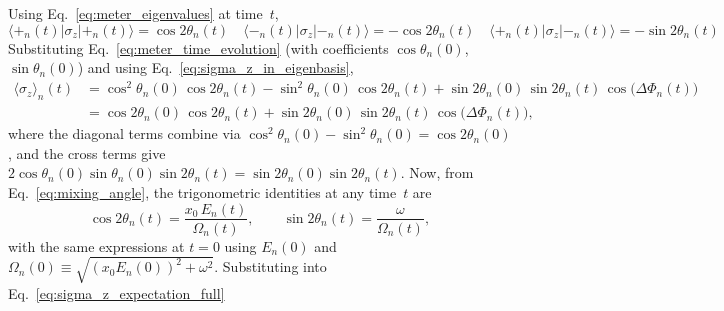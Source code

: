 Using Eq.~\eqref{eq:meter_eigenvalues} at time~$t$,
\begin{equation}\label{eq:sigma_z_in_eigenbasis}
    \langle +_n(t) | \sigma_z | +_n(t) \rangle = \cos 2\theta_n(t) \quad
    \langle -_n(t) | \sigma_z | -_n(t) \rangle = -\cos 2\theta_n(t)  \quad
    \langle +_n(t) | \sigma_z | -_n(t) \rangle = -\sin 2\theta_n(t)
\end{equation}
Substituting Eq.~\eqref{eq:meter_time_evolution} (with coefficients $\cos\theta_n(0)$, $\sin\theta_n(0)$) and using Eq.~\eqref{eq:sigma_z_in_eigenbasis},
\begin{align}\label{eq:sigma_z_expectation_full}
    \langle\sigma_z\rangle_n(t) &= \cos^2\!\theta_n(0)\,\cos 2\theta_n(t) - \sin^2\!\theta_n(0)\,\cos 2\theta_n(t) + \sin 2\theta_n(0)\,\sin 2\theta_n(t)\,\cos\!\big(\Delta\Phi_n(t)\big) \nonumber\\
    &= \cos 2\theta_n(0)\,\cos 2\theta_n(t) + \sin 2\theta_n(0)\,\sin 2\theta_n(t)\,\cos\!\big(\Delta\Phi_n(t)\big),
\end{align}
where the diagonal terms combine via $\cos^2\!\theta_n(0) - \sin^2\!\theta_n(0) = \cos 2\theta_n(0)$, and the cross terms give $2\cos\theta_n(0)\sin\theta_n(0)\sin 2\theta_n(t) = \sin 2\theta_n(0)\sin 2\theta_n(t)$. Now, from Eq.~\eqref{eq:mixing_angle}, the trigonometric identities at any time~$t$ are
\begin{equation}\label{eq:trig_identities}
    \cos 2\theta_n(t) = \frac{x_0\,E_n(t)}{\Omega_n(t)}, \qquad \sin 2\theta_n(t) = \frac{\omega}{\Omega_n(t)},
\end{equation}
with the same expressions at $t=0$ using $E_n(0)$ and $\Omega_n(0) \equiv \sqrt{(x_0 E_n(0))^2 + \omega^2}$. Substituting into Eq.~\eqref{eq:sigma_z_expectation_full}



\newpage
\printbibliography[heading=subbibliography, title={Appendix References}]
